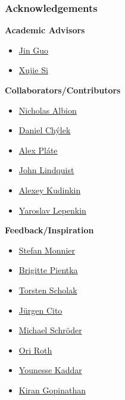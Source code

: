 \documentclass[mathserif,notheorems]{beamer}
\theoremstyle{plain} %
\theoremstyle{definition} %
\begin{document}
\begin{frame}
  \frametitle{Acknowledgements}
  \textbf{Academic Advisors}
  \begin{multicols}{2}
    \begin{itemize}
      \item \href{https://www.cs.mcgill.ca/~jguo/}{Jin Guo}
      \item \href{https://www.cs.toronto.edu/~six/}{Xujie Si}
      \end{itemize}
  \end{multicols}
  \textbf{Collaborators/Contributors}
  \begin{multicols}{2}
    \begin{itemize}
      \item \href{https://github.com/nalbion}{Nicholas Albion}
      \item \href{https://chylex.com/}{Daniel Ch\'ylek}
      \item \href{https://github.com/AlexPl292}{Alex Pl\'ate}
      \item \href{https://johnlindquist.com/}{John Lindquist}
      \item \href{https://github.com/alexeykudinkin}{Alexey Kudinkin}
      \item \href{https://github.com/lepenkinya}{Yaroslav Lepenkin}
    \end{itemize}
  \end{multicols}
  \textbf{Feedback/Inspiration}
  \begin{multicols}{2}
    \begin{itemize}
      \item \href{https://www.iro.umontreal.ca/~monnier/}{Stefan Monnier}
      \item \href{https://www.cs.mcgill.ca/~bpientka/}{Brigitte Pientka}
      \item \href{https://tscholak.github.io/}{Torsten Scholak}
      \item \href{https://people.csail.mit.edu/jcito/}{J\"urgen Cito}
      \item \href{https://mcschroeder.github.io/}{Michael Schr\"oder}
      \item \href{https://oriroth.github.io/}{Ori Roth}
      \item \href{https://younesse.net/}{Younesse Kaddar}
      \item \href{https://gopiandcode.uk/}{Kiran Gopinathan}
    \end{itemize}
  \end{multicols}
\end{frame}
\end{document}
